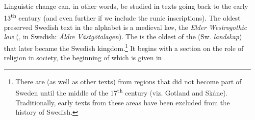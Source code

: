 \documentclass[output=paper]{langscibook}
\begin{document}
Linguistic change can, in other words, be studied in texts going back to the early 13\textsuperscript{th} century (and even further if we include the runic inscriptions). The oldest preserved Swedish text in the  alphabet is a medieval law, the \textit{Elder Westrogothic law} (, in Swedish: \textit{Äldre Västgötalagen}). The  is the oldest of the  (Sw. \textit{landskap}) that later became the Swedish kingdom.\footnote{There are  (as well as other texts) from regions that did not become part of Sweden until the middle of the 17\textsuperscript{th} century (viz. Gotland and Skåne). Traditionally, early texts from these areas have been excluded from the history of Swedish.} It begins with a section on the role of religion in society, the beginning of which is given in .
\end{document}
